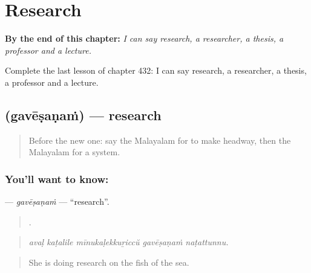 
\chapter{Research}
\label{ch:ml-research}

\begin{chapteropening}
\textbf{By the end of this chapter:} \emph{I can say research, a researcher, a thesis, a professor and a lecture.}

Complete the last lesson of chapter 432: I can say research, a researcher, a thesis, a professor and a lecture.
\end{chapteropening}

\section[\texorpdfstring{\ml{ഗവേഷണം} (gavēṣaṇaṁ)}{ഗവേഷണം (gavēṣaṇaṁ)}]{ (gavēṣaṇaṁ) — research}

\label{lesson:ML-C432-gavesanam}



\begin{quote}
Before the new one: say the Malayalam for to make headway, then the Malayalam for a system.
\end{quote}

\subsection*{You'll want to know: }
\textbf{} — \emph{gavēṣaṇaṁ} — \textquotedblleft{}research\textquotedblright{}.

\begin{quote}
    .
\end{quote}

\begin{quote}
\emph{avaḷ kaṭalile mīnukaḷekkuṟiccŭ gavēṣaṇaṁ naṭattunnu.}
\end{quote}

\begin{quote}
She is doing research on the fish of the sea.
\end{quote}


